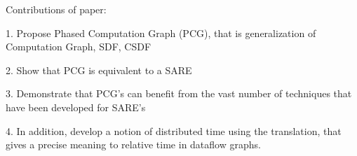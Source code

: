 Contributions of paper:

1. Propose Phased Computation Graph (PCG), that is generalization of
   Computation Graph, SDF, CSDF

2. Show that PCG is equivalent to a SARE 

3. Demonstrate that PCG's can benefit from the vast number of
   techniques that have been developed for SARE's

4. In addition, develop a notion of distributed time using the
   translation, that gives a precise meaning to relative time in
   dataflow graphs.

